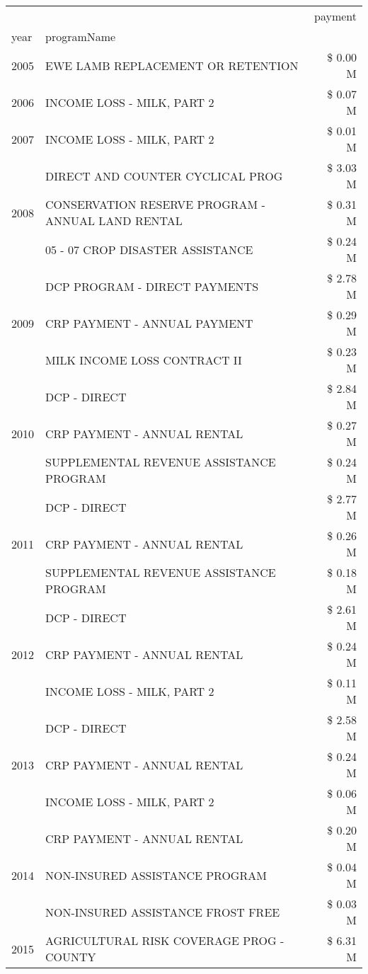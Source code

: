 \begin{tabular}{llr}
\toprule
 &  & payment \\
year & programName &  \\
\midrule
2005 & EWE LAMB REPLACEMENT OR RETENTION & \$ 0.00 M \\
\cline{1-3}
2006 & INCOME LOSS - MILK, PART 2 & \$ 0.07 M \\
\cline{1-3}
2007 & INCOME LOSS - MILK, PART 2 & \$ 0.01 M \\
\cline{1-3}
\multirow[t]{3}{*}{2008} & DIRECT AND COUNTER CYCLICAL PROG & \$ 3.03 M \\
 & CONSERVATION RESERVE PROGRAM - ANNUAL LAND RENTAL & \$ 0.31 M \\
 & 05 - 07 CROP DISASTER ASSISTANCE & \$ 0.24 M \\
\cline{1-3}
\multirow[t]{3}{*}{2009} & DCP PROGRAM - DIRECT PAYMENTS & \$ 2.78 M \\
 & CRP PAYMENT - ANNUAL PAYMENT & \$ 0.29 M \\
 & MILK INCOME LOSS CONTRACT II & \$ 0.23 M \\
\cline{1-3}
\multirow[t]{3}{*}{2010} & DCP - DIRECT & \$ 2.84 M \\
 & CRP PAYMENT - ANNUAL RENTAL & \$ 0.27 M \\
 & SUPPLEMENTAL REVENUE ASSISTANCE PROGRAM & \$ 0.24 M \\
\cline{1-3}
\multirow[t]{3}{*}{2011} & DCP - DIRECT & \$ 2.77 M \\
 & CRP PAYMENT - ANNUAL RENTAL & \$ 0.26 M \\
 & SUPPLEMENTAL REVENUE ASSISTANCE PROGRAM & \$ 0.18 M \\
\cline{1-3}
\multirow[t]{3}{*}{2012} & DCP - DIRECT & \$ 2.61 M \\
 & CRP PAYMENT - ANNUAL RENTAL & \$ 0.24 M \\
 & INCOME LOSS - MILK, PART 2 & \$ 0.11 M \\
\cline{1-3}
\multirow[t]{3}{*}{2013} & DCP - DIRECT & \$ 2.58 M \\
 & CRP PAYMENT - ANNUAL RENTAL & \$ 0.24 M \\
 & INCOME LOSS - MILK, PART 2 & \$ 0.06 M \\
\cline{1-3}
\multirow[t]{3}{*}{2014} & CRP PAYMENT - ANNUAL RENTAL & \$ 0.20 M \\
 & NON-INSURED ASSISTANCE PROGRAM & \$ 0.04 M \\
 & NON-INSURED ASSISTANCE FROST FREE & \$ 0.03 M \\
\cline{1-3}
\multirow[t]{3}{*}{2015} & AGRICULTURAL RISK COVERAGE PROG - COUNTY & \$ 6.31 M \\

\end{tabular}
